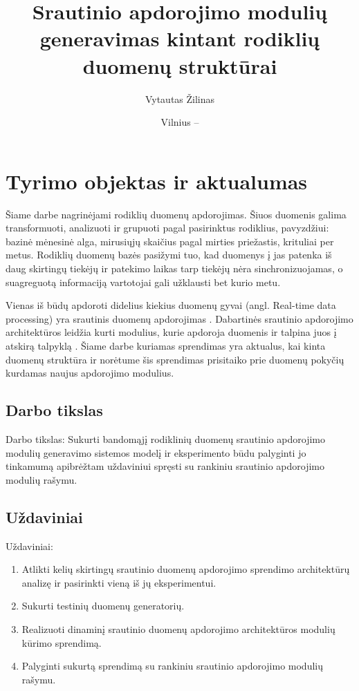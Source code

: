 \documentclass{VUMIFPSbakalaurinis}
\title{Srautinio apdorojimo modulių generavimas kintant rodiklių duomenų struktūrai}
\author{Vytautas Žilinas}
\date{Vilnius – \the\year}
\begin{document}
 
\maketitle

\cleardoublepage{}
\setcounter{page}{2}

\section{Tyrimo objektas ir aktualumas}
Šiame darbe nagrinėjami rodiklių duomenų apdorojimas. Šiuos duomenis galima transformuoti, analizuoti ir grupuoti pagal pasirinktus rodiklius, 
pavyzdžiui: bazinė mėnesinė alga, mirusiųjų skaičius pagal mirties priežastis, krituliai per metus. 
Rodiklių duomenų bazės pasižymi tuo, kad duomenys į jas patenka iš daug skirtingų tiekėjų ir patekimo laikas tarp tiekėjų nėra 
sinchronizuojamas, o suagreguotą informaciją vartotojai gali užklausti bet kurio metu.  \par
Vienas iš būdų apdoroti didelius kiekius duomenų gyvai (angl. Real-time data processing) yra srautinis duomenų apdorojimas \cite{BigData, StreamProcessingInData}. 
Dabartinės srautinio apdorojimo architektūros leidžia kurti modulius, kurie apdoroja duomenis ir talpina juos į atskirą talpyklą \cite{8Requirements}. 
Šiame darbe kuriamas sprendimas yra aktualus, kai kinta duomenų struktūra ir norėtume šis sprendimas prisitaiko 
prie duomenų pokyčių kurdamas naujus apdorojimo modulius.

\subsection{Darbo tikslas}
Darbo tikslas: Sukurti bandomąjį rodiklinių duomenų srautinio apdorojimo modulių 
generavimo sistemos modelį ir eksperimento būdu palyginti jo tinkamumą apibrėžtam 
uždaviniui spręsti su rankiniu srautinio apdorojimo modulių rašymu.

\subsection{Uždaviniai}
Uždaviniai:
\begin{enumerate}
    \item Atlikti kelių skirtingų srautinio duomenų apdorojimo sprendimo architektūrų analizę ir pasirinkti vieną iš jų eksperimentui.
    \item Sukurti testinių duomenų generatorių.
    \item Realizuoti dinaminį srautinio duomenų apdorojimo architektūros modulių kūrimo sprendimą.
    \item Palyginti sukurtą sprendimą su rankiniu srautinio apdorojimo modulių rašymu.
\end{enumerate}
\end{document}
